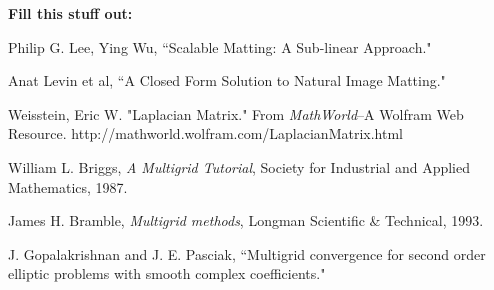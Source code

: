 \textbf{Fill this stuff out:}

\begin{thebibliography}{9}
	Philip G. Lee, Ying Wu,
	``Scalable Matting: A Sub-linear Approach."
	
	Anat Levin et al,
	``A Closed Form Solution to Natural Image Matting."
	
	 Weisstein, Eric W. "Laplacian Matrix." From 	\textit{MathWorld}--A Wolfram Web Resource. http://mathworld.wolfram.com/LaplacianMatrix.html 
	 
	William L. Briggs, \textit{A Multigrid Tutorial},
	Society for Industrial and Applied Mathematics, 1987.
	
	James H. Bramble, \textit{Multigrid methods},
	Longman Scientific \& Technical, 1993.
	
	J. Gopalakrishnan and J. E. Pasciak,
	``Multigrid convergence for
second order elliptic problems with smooth complex coefficients."

\end{thebibliography}